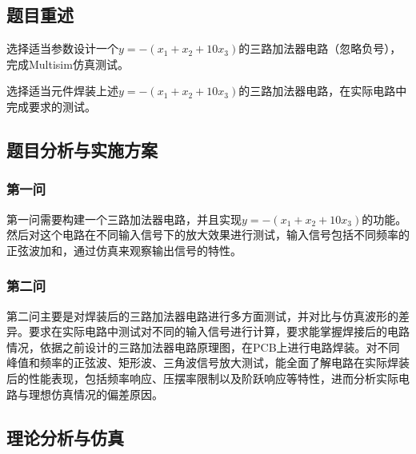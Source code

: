 \documentclass[./测控三级项目.tex]{subfiles} %
\begin{document}
	\subsection{题目重述}
		\begin{compactenum}
			\item 选择适当参数设计一个$y=-(x_1+x_2+10x_3)$的三路加法器电路（忽略负号），完成Multisim仿真测试。
			\item 选择适当元件焊装上述$y=-(x_1+x_2+10x_3)$的三路加法器电路，在实际电路中完成要求的测试。
		\end{compactenum}
	\subsection{题目分析与实施方案}
		\subsubsection{第一问}
			第一问需要构建一个三路加法器电路，并且实现$y=-(x_1+x_2+10x_3)$的功能。然后对这个电路在不同输入信号下的放大效果进行测试，输入信号包括不同频率的正弦波加和，通过仿真来观察输出信号的特性。
		\subsubsection{第二问}
			第二问主要是对焊装后的三路加法器电路进行多方面测试，并对比与仿真波形的差异。要求在实际电路中测试对不同的输入信号进行计算，要求能掌握焊接后的电路情况，依据之前设计的三路加法器电路原理图，在PCB上进行电路焊装。对不同峰值和频率的正弦波、矩形波、三角波信号放大测试，能全面了解电路在实际焊装后的性能表现，包括频率响应、压摆率限制以及阶跃响应等特性，进而分析实际电路与理想仿真情况的偏差原因。
	
	\subsection{理论分析与仿真}
\end{document}
